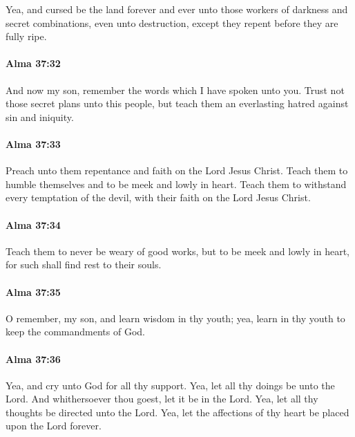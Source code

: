			Yea, and cursed be the land forever and ever
			unto those workers of darkness and secret combinations, even unto destruction,
			except they repent before they are fully ripe.

		\paragraph{Alma 37:32} %
			\label{ALMA-37-32}

			And now my son, remember the words which I have spoken unto you.
			Trust not those secret plans unto this people,
			but teach them an everlasting hatred against sin and iniquity.

		\paragraph{Alma 37:33} %
			\label{ALMA-37-33}

			Preach unto them repentance and faith on the Lord Jesus Christ.
			Teach them to humble themselves and to be meek and lowly in heart.
			Teach them to withstand every temptation of the devil,
			with their faith on the Lord Jesus Christ.

		\paragraph{Alma 37:34} %
			\label{ALMA-37-34}

			Teach them to never be weary of good works,
			but to be meek and lowly in heart,
			for such shall find rest to their souls.

		\paragraph{Alma 37:35} %
			\label{ALMA-37-35}

			O remember, my son, and learn wisdom in thy youth;
			yea, learn in thy youth to keep the commandments of God.

		\paragraph{Alma 37:36} %
			\label{ALMA-37-36}

			Yea, and cry unto God for all thy support.
			Yea, let all thy doings be unto the Lord.
			And whithersoever thou goest,
			let it be in the Lord.
			Yea, let all thy thoughts be directed unto the Lord.
			Yea, let the affections of thy heart be placed upon the Lord forever.

